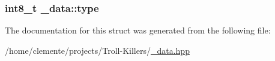 \subsubsection[{type}]{\setlength{\rightskip}{0pt plus 5cm}int8\+\_\+t \+\_\+data\+::type}\label{struct__data_afa7c65aa86c5c877d1b23746b27f7ccd}


The documentation for this struct was generated from the following file\+:\begin{DoxyCompactItemize}
\item 
/home/clemente/projects/\+Troll-\/\+Killers/\hyperlink{__data_8hpp}{\+\_\+data.\+hpp}\end{DoxyCompactItemize}
